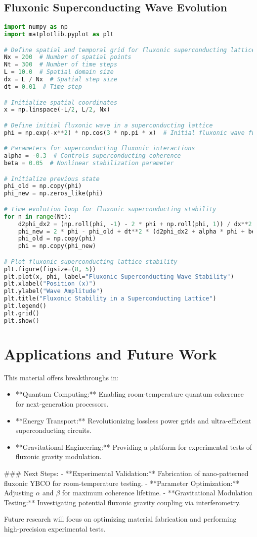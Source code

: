\documentclass{article}
\begin{document}
\subsection{Fluxonic Superconducting Wave Evolution}
\begin{lstlisting}[language=Python]
import numpy as np
import matplotlib.pyplot as plt

# Define spatial and temporal grid for fluxonic superconducting lattice
Nx = 200  # Number of spatial points
Nt = 300  # Number of time steps
L = 10.0  # Spatial domain size
dx = L / Nx  # Spatial step size
dt = 0.01  # Time step

# Initialize spatial coordinates
x = np.linspace(-L/2, L/2, Nx)

# Define initial fluxonic wave in a superconducting lattice
phi = np.exp(-x**2) * np.cos(3 * np.pi * x)  # Initial fluxonic wave function

# Parameters for superconducting fluxonic interactions
alpha = -0.3  # Controls superconducting coherence
beta = 0.05  # Nonlinear stabilization parameter

# Initialize previous state
phi_old = np.copy(phi)
phi_new = np.zeros_like(phi)

# Time evolution loop for fluxonic superconducting stability
for n in range(Nt):
    d2phi_dx2 = (np.roll(phi, -1) - 2 * phi + np.roll(phi, 1)) / dx**2
    phi_new = 2 * phi - phi_old + dt**2 * (d2phi_dx2 + alpha * phi + beta * phi**3)
    phi_old = np.copy(phi)
    phi = np.copy(phi_new)

# Plot fluxonic superconducting lattice stability
plt.figure(figsize=(8, 5))
plt.plot(x, phi, label="Fluxonic Superconducting Wave Stability")
plt.xlabel("Position (x)")
plt.ylabel("Wave Amplitude")
plt.title("Fluxonic Stability in a Superconducting Lattice")
plt.legend()
plt.grid()
plt.show()
\end{lstlisting}

\section{Applications and Future Work}
This material offers breakthroughs in:
\begin{itemize}
    \item **Quantum Computing:** Enabling room-temperature quantum coherence for next-generation processors.
    \item **Energy Transport:** Revolutionizing lossless power grids and ultra-efficient superconducting circuits.
    \item **Gravitational Engineering:** Providing a platform for experimental tests of fluxonic gravity modulation.
\end{itemize}

### Next Steps:
- **Experimental Validation:** Fabrication of nano-patterned fluxonic YBCO for room-temperature testing.
- **Parameter Optimization:** Adjusting \(\alpha\) and \(\beta\) for maximum coherence lifetime.
- **Gravitational Modulation Testing:** Investigating potential fluxonic gravity coupling via interferometry.

Future research will focus on optimizing material fabrication and performing high-precision experimental tests.
\end{document}
